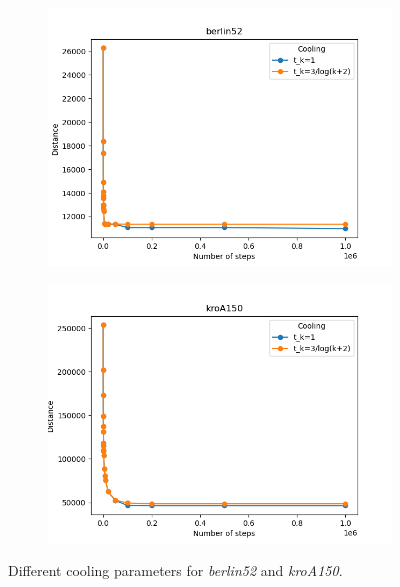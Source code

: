 \begin{figure}[!htb]
	\centering
	\begin{subfigure}{0.45\textwidth}
		\includegraphics[width=\textwidth]{img/berlin52_annealing_locally=False}
	\end{subfigure}
	\begin{subfigure}{0.45\textwidth}
		\includegraphics[width=\textwidth]{img/kroA150_annealing_locally=False}
	\end{subfigure}
	\caption{Different cooling parameters for \textit{berlin52} and \textit{kroA150}.}
\end{figure}